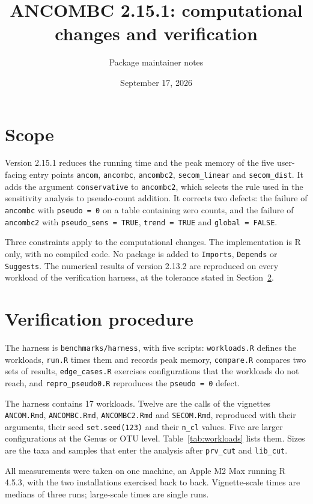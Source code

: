 \documentclass[11pt]{article}
\title{\textbf{ANCOMBC 2.15.1: computational changes and verification}}
\author{Package maintainer notes}
\date{September 17, 2026}
\newcommand{\code}[1]{\texttt{#1}}
\begin{document}
\maketitle

\section{Scope}

Version 2.15.1 reduces the running time and the peak memory of the five
user-facing entry points \code{ancom}, \code{ancombc}, \code{ancombc2},
\code{secom\_linear} and \code{secom\_dist}. It adds the argument
\code{conservative} to \code{ancombc2}, which selects the rule used in the
sensitivity analysis to pseudo-count addition. It corrects two defects: the
failure of \code{ancombc} with \code{pseudo = 0} on a table containing zero
counts, and the failure of \code{ancombc2} with \code{pseudo\_sens = TRUE},
\code{trend = TRUE} and \code{global = FALSE}.

Three constraints apply to the computational changes. The implementation is R
only, with no compiled code. No package is added to \code{Imports},
\code{Depends} or \code{Suggests}. The numerical results of version 2.13.2 are
reproduced on every workload of the verification harness, at the tolerance
stated in Section~\ref{sec:verification}.

\section{Verification procedure}
\label{sec:verification}

The harness is \code{benchmarks/harness}, with five scripts:
\code{workloads.R} defines the workloads, \code{run.R} times them and records
peak memory, \code{compare.R} compares two sets of results,
\code{edge\_cases.R} exercises configurations that the workloads do not reach,
and \code{repro\_pseudo0.R} reproduces the \code{pseudo = 0} defect.

The harness contains 17 workloads. Twelve are the calls of the vignettes
\code{ANCOM.Rmd}, \code{ANCOMBC.Rmd}, \code{ANCOMBC2.Rmd} and \code{SECOM.Rmd},
reproduced with their arguments, their seed \code{set.seed(123)} and their
\code{n\_cl} values. Five are larger configurations at the Genus or OTU level.
Table~\ref{tab:workloads} lists them. Sizes are the taxa and samples that enter
the analysis after \code{prv\_cut} and \code{lib\_cut}.

All measurements were taken on one machine, an Apple M2 Max running R 4.5.3,
with the two installations exercised back to back. Vignette-scale times are
medians of three runs; large-scale times are single runs.
\end{document}
